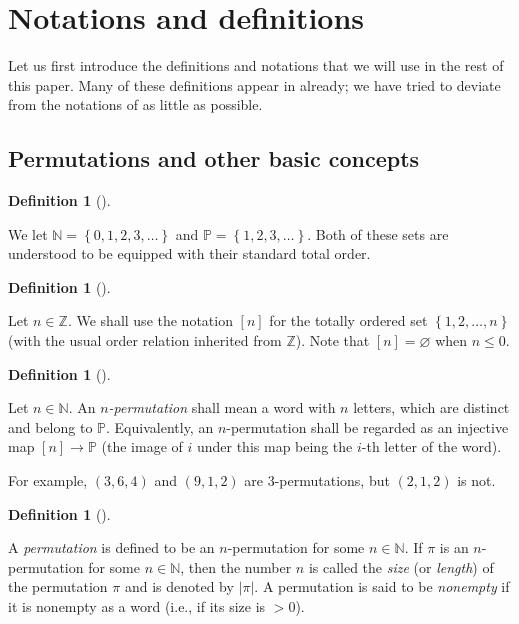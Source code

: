 \documentclass[numbers=enddot,12pt,final,onecolumn,notitlepage]{scrartcl}%
\theoremstyle{definition}
\newtheorem{defi}[theo]{Definition}
\newenvironment{definition}[1][]
{\begin{defi}[#1]\begin{leftbar}}
{\end{leftbar}\end{defi}}
\begin{document}
\section{\label{sect.notations}Notations and definitions}

Let us first introduce the definitions and notations that we will use in the
rest of this paper. Many of these definitions appear in \cite{part1} already;
we have tried to deviate from the notations of \cite{part1} as little as possible.

\subsection{Permutations and other basic concepts}

\begin{definition}
We let $\mathbb{N}=\left\{  0,1,2,3,\ldots\right\}  $ and $\mathbb{P}=\left\{
1,2,3,\ldots\right\}  $. Both of these sets are understood to be equipped with
their standard total order.
\end{definition}

\begin{definition}
Let $n\in\mathbb{Z}$. We shall use the notation $\left[  n\right]  $ for the
totally ordered set $\left\{  1,2,\ldots,n\right\}  $ (with the usual order
relation inherited from $\mathbb{Z}$). Note that $\left[  n\right]
=\varnothing$ when $n\leq0$.
\end{definition}

\begin{definition}
\label{def.perm}Let $n\in\mathbb{N}$. An $n$\textit{-permutation} shall mean a
word with $n$ letters, which are distinct and belong to $\mathbb{P}$.
Equivalently, an $n$-permutation shall be regarded as an injective map
$\left[  n\right]  \rightarrow\mathbb{P}$ (the image of $i$ under this map
being the $i$-th letter of the word).
\end{definition}

For example, $\left(  3,6,4\right)  $ and $\left(  9,1,2\right)  $ are
$3$-permutations, but $\left(  2,1,2\right)  $ is not.

\begin{definition}
A \textit{permutation} is defined to be an $n$-permutation for some
$n\in\mathbb{N}$. If $\pi$ is an $n$-permutation for some $n\in\mathbb{N}$,
then the number $n$ is called the \textit{size} (or \textit{length}) of the
permutation $\pi$ and is denoted by $\left\vert \pi\right\vert $. A
permutation is said to be \textit{nonempty} if it is nonempty as a word (i.e.,
if its size is $>0$).
\end{definition}
\end{document}
